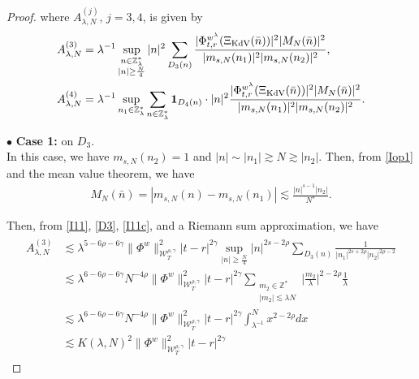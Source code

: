 \documentclass[letterpaper, 11pt,  reqno]{amsart}
\newcommand{\1}{\hspace{0.5mm}\text{I}\hspace{0.5mm}}
\newcommand{\noi}{\noindent}
\newcommand{\Z}{\mathbb{Z}}
\newcommand{\g}{\gamma}
\newcommand{\ld}{\lambda}
\newcommand{\les}{\lesssim}
\newcommand{\ges}{\gtrsim}
\newcommand{\ind}{\mathbf 1}
\newcommand{\W}{\mathcal{W}}
\newcommand{\KDV}{\text{\rm KdV} }
\numberwithin{equation}{section}
\numberwithin{theorem}{section}
\begin{document}
\begin{proof}
\noi
where $A_{\ld, N}^{(j)}$, $j =  3, 4$, is given by 
\begin{align}
A_{\ld, N}^{(3)}
& =
 \ld^{-1}\sup_{\substack{n\in \Z_\ld^*\\|n|\geq \frac N4}} |n|^2\sum_{D_3(n)}
 \frac{|\Phi^{w^\ld}_{t,r}(\Xi_\KDV(\bar n)) |^2  |M_N(\bar n)|^2 }{ |m_{s, N}(n_1)|^2|m_{s, N}(n_2)|^2},
\label{I11}\\
A_{\ld, N}^{(4)}
& =
\ld^{-1} 
\sup_{n_1 \in \Z_\ld^*} 
\sum_{n\in \Z_\ld^*} 
\ind_{D_4(n)}\cdot |n|^2 
\frac{ |\Phi^{w^\ld}_{t,r}(\Xi_\KDV(\bar n))|^2 |M_N(\bar n)|^2}{|m_{s, N}(n_1)|^2 |m_{s, N}(n_2)|^2}.
\label{I11a}
\end{align}







%
%


\medskip

\noi
$\bullet$ \textbf{Case 1:} on  $D_3$.\\
\indent
In this case, we have $m_{s, N}(n_2) = 1$
and $|n| \sim |n_1| \ges N \ges |n_2|$.
Then,  from \eqref{Iop1} and the mean value theorem, we have
\begin{align}
M_N(\bar n)
= |m_{s, N}(n)-m_{s, N}(n_1)|\les \frac{|n|^{s-1}|n_2|}{N^s}.
\label{I11c}
\end{align}



\noi
Then, from 
\eqref{I11}, \eqref{D3},   \eqref{I11c}, 
and a Riemann sum approximation,  we have 
\begin{align}
\begin{split}
A_{\ld, N}^{(3)}
&  \les 
\ld^{5-6\rho - 6\g}
  \|\Phi^{w} \|^2_{\W^{\rho,\g}_T} |t-r|^{2\g}
\sup_{|n|\geq \frac N4}|n|^{2s-2\rho}
\sum_{D_3(n)} \frac{1}{|n_1|^{2s+2\rho}|n_2|^{2\rho-2}}\\
&  \les 
\ld^{6-6\rho - 6\g}N^{-4\rho}
  \|\Phi^{w} \|^2_{\W^{\rho,\g}_T} |t-r|^{2\g}
  \sum_{\substack{m_2 \in \Z^*\\ |m_2|\les \ld N}} 
 \Big|\frac {m_2}\ld \Big|^{2-2\rho}\frac 1\ld\\
&  \les 
\ld^{6-6\rho - 6\g}N^{-4\rho}
  \|\Phi^{w} \|^2_{\W^{\rho,\g}_T} |t-r|^{2\g}
\int_{\ld^{-1}}^N x^{2- 2\rho} dx\\
 &\les 
K(\ld, N)^2
 \| \Phi^{w} \|^2_{\W_{T}^{\rho, \g}}  
|t-r|^{2\g}
\end{split}
\label{I11b}
 \end{align}
 

\end{proof}
\end{document}
